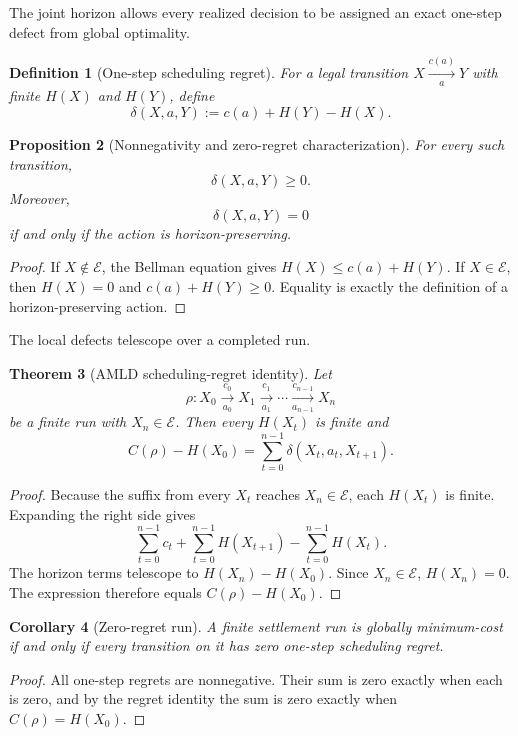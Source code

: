 \documentclass[11pt]{article}
\newtheorem{definition}{Definition}[section]
\newtheorem{theorem}[definition]{Theorem}
\newtheorem{proposition}[definition]{Proposition}
\newtheorem{corollary}[definition]{Corollary}
\theoremstyle{remark}
\newcommand{\Exit}{\mathcal E}
\begin{document}
The joint horizon allows every realized decision to be assigned an exact one-step defect from global optimality.

\begin{definition}[One-step scheduling regret]
For a legal transition $X\xrightarrow[a]{c(a)}Y$ with finite $H(X)$ and $H(Y)$, define
\[
\delta(X,a,Y):=c(a)+H(Y)-H(X).
\]
\end{definition}

\begin{proposition}[Nonnegativity and zero-regret characterization]
For every such transition,
\[
\delta(X,a,Y)\ge0.
\]
Moreover,
\[
\delta(X,a,Y)=0
\]
if and only if the action is horizon-preserving.
\end{proposition}
\begin{proof}
If $X\notin\Exit$, the Bellman equation gives $H(X)\le c(a)+H(Y)$. If $X\in\Exit$, then $H(X)=0$ and $c(a)+H(Y)\ge0$. Equality is exactly the definition of a horizon-preserving action.
\end{proof}

The local defects telescope over a completed run.

\begin{theorem}[AMLD scheduling-regret identity]
Let
\[
\rho:X_0\xrightarrow[a_0]{c_0}X_1\xrightarrow[a_1]{c_1}\cdots\xrightarrow[a_{n-1}]{c_{n-1}}X_n
\]
be a finite run with $X_n\in\Exit$. Then every $H(X_t)$ is finite and
\[
\boxed{
C(\rho)-H(X_0)
=
\sum_{t=0}^{n-1}\delta(X_t,a_t,X_{t+1}).
}
\]
\end{theorem}
\begin{proof}
Because the suffix from every $X_t$ reaches $X_n\in\Exit$, each $H(X_t)$ is finite. Expanding the right side gives
\[
\sum_{t=0}^{n-1}c_t
+\sum_{t=0}^{n-1}H(X_{t+1})
-\sum_{t=0}^{n-1}H(X_t).
\]
The horizon terms telescope to $H(X_n)-H(X_0)$. Since $X_n\in\Exit$, $H(X_n)=0$. The expression therefore equals $C(\rho)-H(X_0)$.
\end{proof}

\begin{corollary}[Zero-regret run]
A finite settlement run is globally minimum-cost if and only if every transition on it has zero one-step scheduling regret.
\end{corollary}
\begin{proof}
All one-step regrets are nonnegative. Their sum is zero exactly when each is zero, and by the regret identity the sum is zero exactly when $C(\rho)=H(X_0)$.
\end{proof}
\end{document}
